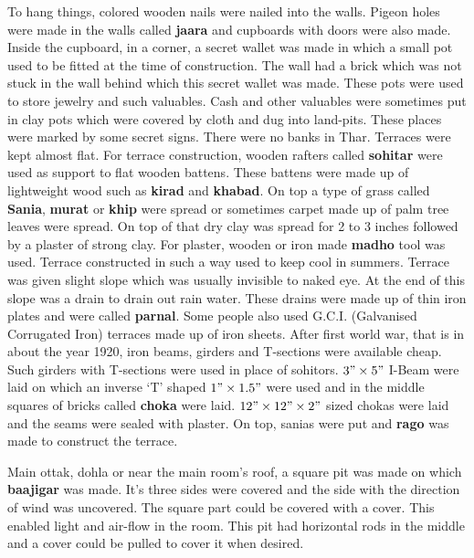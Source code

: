 To hang things, colored wooden nails were nailed into the walls. Pigeon holes
were made in the walls called \textbf{jaara} and cupboards with doors were also
made. Inside the cupboard, in a corner, a secret wallet was made in which a
small pot used to be fitted at the time of construction. The wall had a brick
which was not stuck in the wall behind which this secret wallet was made. These
pots were used to store jewelry and such valuables. Cash and other valuables
were sometimes put in clay pots which were covered by cloth and dug into
land-pits. These places were marked by some secret signs. There were no banks in
Thar. 
Terraces were kept almost flat. For terrace construction, wooden rafters called
\textbf{sohitar} were used as support to flat wooden battens. These battens
were made up of lightweight wood such as \textbf{kirad} and \textbf{khabad}. On
top a type of grass called \textbf{Sania}, \textbf{murat} or \textbf{khip} were
spread or sometimes carpet made up of palm tree leaves were spread. On top of
that dry clay was spread for 2 to 3 inches followed by a plaster of strong
clay. For plaster, wooden or iron made \textbf{madho} tool was used. Terrace
constructed in such a way used to keep cool in summers. Terrace was given
slight slope which was usually invisible to naked eye. At the end of this slope
was a drain to drain out rain water. These drains were made up of thin iron
plates and were called \textbf{parnal}. Some people also used G.C.I.
(Galvanised Corrugated Iron) terraces made up of iron sheets.  After first
world war, that is in about the year 1920, iron beams, girders and T-sections
were available cheap. Such girders with T-sections were used in place of
sohitors. $3" \times 5"$ I-Beam were laid on which an inverse `T' shaped $1"
\times 1.5"$ were used and in the middle squares of bricks called
\textbf{choka} were laid. $12" \times 12" \times 2"$ sized chokas were laid and
the seams were sealed with plaster. On top, sanias were put and \textbf{rago}
was made to construct the terrace.

Main ottak, dohla or near the main room's roof, a square pit was made on which
\textbf{baajigar} was made. It's three sides were covered and the side with the
direction of wind was uncovered. The square part could be covered with a cover.
This enabled light and air-flow in the room. This pit had horizontal rods in the
middle and a cover could be pulled to cover it when desired.

